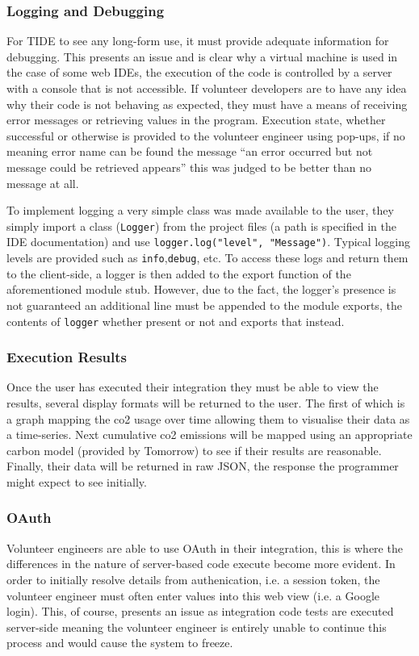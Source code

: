 \documentclass[jou,apacite]{apa6}
\begin{document}
\subsubsection{Logging and Debugging}
For TIDE to see any long-form use, it must provide adequate information for debugging. This presents an issue and is clear why a virtual machine is used in the case of some web IDEs, the execution of the code is controlled by a server with a console that is not accessible. If volunteer developers are to have any idea why their code is not behaving as expected, they must have a means of receiving error messages or retrieving values in the program. Execution state, whether successful or otherwise is provided to the volunteer engineer using pop-ups, if no meaning error name can be found the message “an error occurred but not message could be retrieved appears” this was judged to be better than no message at all.

To implement logging a very simple class was made available to the user, they simply import a class (\texttt{Logger}) from the project files (a path is specified in the IDE documentation) and use \texttt{logger.log("level", "Message")}. Typical logging levels are provided such as \texttt{info},\texttt{debug}, etc. To access these logs and return them to the client-side, a logger is then added to the export function of the aforementioned module stub. However, due to the fact, the logger's presence is not guaranteed an additional line must be appended to the module exports, the contents of \texttt{logger} whether present or not and exports that instead.

\subsubsection{Execution Results}
Once the user has executed their integration they must be able to view the results, several display formats will be returned to the user. The first of which is a graph mapping the co2 usage over time allowing them to visualise their data as a time-series. Next cumulative co2 emissions will be mapped using an appropriate carbon model (provided by Tomorrow) to see if their results are reasonable. Finally, their data will be returned in raw JSON, the response the programmer might expect to see initially. 

\subsubsection{OAuth}
Volunteer engineers are able to use OAuth in their integration, this is where the differences in the nature of server-based code execute become more evident. In order to initially resolve details from authenication, i.e. a session token, the volunteer engineer must often enter values into this web view (i.e. a Google login). This, of course, presents an issue as integration code tests are executed server-side meaning the volunteer engineer is entirely unable to continue this process and would cause the system to freeze. 
\end{document}
